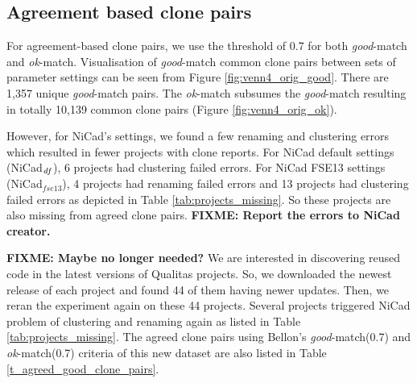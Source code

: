 \documentclass{sig-alternate-05-2015}
\newcommand\FIXME[1]{\textbf{FIXME: #1}}
\begin{document}
\subsection{Agreement based clone pairs}

For agreement-based clone pairs, we use the threshold of 0.7 for both \textit{good}-match and \textit{ok}-match. Visualisation of \textit{good}-match common clone pairs between sets of parameter settings can be seen from Figure \ref{fig:venn4_orig_good}. There are 1,357 unique \textit{good}-match pairs. The \textit{ok}-match subsumes the \textit{good}-match resulting in totally 10,139 common clone pairs (Figure \ref{fig:venn4_orig_ok}).

However, for NiCad's settings, we found a few renaming and clustering errors which resulted in fewer projects with clone reports. For NiCad default settings (NiCad$_{\textrm{\textit{df}}}$), 6 projects had clustering failed errors. For NiCad FSE13 settings (NiCad$_{fse13}$), 4 projects had renaming failed errors and 13 projects had clustering failed errors as depicted in Table \ref{tab:projects_missing}. So these projects are also missing from agreed clone pairs. \FIXME{Report the errors to NiCad creator.}

\FIXME{Maybe no longer needed?} We are interested in discovering reused code in the latest versions of Qualitas projects. So, we downloaded the newest release of each project and found 44 of them having newer updates. Then, we reran the experiment again on these 44 projects. Several projects triggered NiCad problem of clustering and renaming again as listed in Table \ref{tab:projects_missing}. The agreed clone pairs using Bellon's \textit{good}-match(0.7) and \textit{ok}-match(0.7) criteria of this new dataset are also listed in Table \ref{t_agreed_good_clone_pairs}. 
\end{document}
